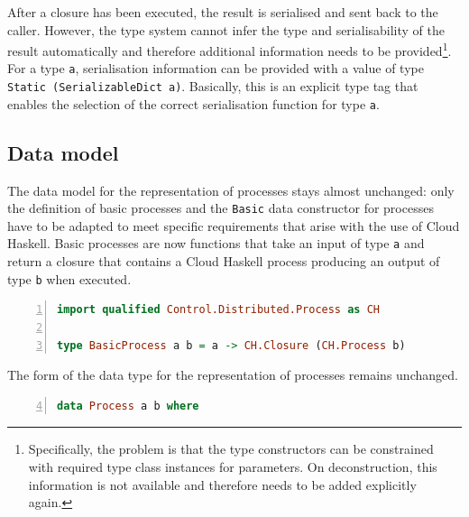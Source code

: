 After a closure has been executed, the result is serialised and sent back to the caller. However, the type system cannot infer the type and serialisability of the result automatically and therefore additional information needs to be provided\footnote{Specifically, the problem is that the type constructors can be constrained with required type class instances for parameters. On deconstruction, this information is not available and therefore needs to be added explicitly again.}. For a type \texttt{a}, serialisation information can be provided with a value of type \texttt{Static (SerializableDict a)}. Basically, this is an explicit type tag that enables the selection of the correct serialisation function for type \texttt{a}.

\subsection{Data model}
\label{chp:distributed_model}
The data model for the representation of processes stays almost unchanged: only the definition of basic processes and the \texttt{Basic} data constructor for processes have to be adapted to meet specific requirements that arise with the use of \textsf{Cloud Haskell}. Basic processes are now functions that take an input of type \texttt{a} and return a closure that contains a \textsf{Cloud Haskell} process producing an output of type \texttt{b} when executed.
\begin{lstlisting}[language=Haskell,caption=Representation of basic processes as computations in the \texttt{CH.Process} monad.,numbers=left,frame=bt]
import qualified Control.Distributed.Process as CH

type BasicProcess a b = a -> CH.Closure (CH.Process b)
\end{lstlisting}

The form of the data type for the representation of processes remains unchanged.
\begin{lstlisting}[language=Haskell,caption=Data type for the representation of processes.,label=lst:distributed_datatypes,numbers=left,frame=bt,firstnumber=4]
data Process a b where
\end{lstlisting}

